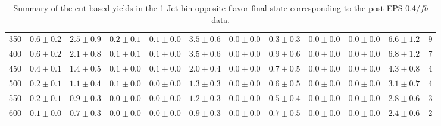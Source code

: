\begin{table}[!hb]
{\begin{center}
\begin{tabular}{l c c c c c c c c c c c }
350 & $0.6\pm0.2$ & $2.5\pm0.9$ & $0.2\pm0.1$ & $0.1\pm0.0$ & $3.5\pm0.6$ & $0.0\pm0.0$ & $0.3\pm0.3$ & $0.0\pm0.0$ & $0.0\pm0.0$ & $6.6\pm1.2$ & 9 \\
400 & $0.6\pm0.2$ & $2.1\pm0.8$ & $0.1\pm0.1$ & $0.1\pm0.0$ & $3.5\pm0.6$ & $0.0\pm0.0$ & $0.9\pm0.6$ & $0.0\pm0.0$ & $0.0\pm0.0$ & $6.8\pm1.2$ & 7 \\
450 & $0.4\pm0.1$ & $1.4\pm0.5$ & $0.1\pm0.0$ & $0.1\pm0.0$ & $2.0\pm0.4$ & $0.0\pm0.0$ & $0.7\pm0.5$ & $0.0\pm0.0$ & $0.0\pm0.0$ & $4.3\pm0.8$ & 4 \\
500 & $0.2\pm0.1$ & $1.1\pm0.4$ & $0.1\pm0.0$ & $0.0\pm0.0$ & $1.3\pm0.3$ & $0.0\pm0.0$ & $0.6\pm0.5$ & $0.0\pm0.0$ & $0.0\pm0.0$ & $3.1\pm0.7$ & 4 \\
550 & $0.2\pm0.1$ & $0.9\pm0.3$ & $0.0\pm0.0$ & $0.0\pm0.0$ & $1.2\pm0.3$ & $0.0\pm0.0$ & $0.5\pm0.4$ & $0.0\pm0.0$ & $0.0\pm0.0$ & $2.8\pm0.6$ & 3 \\
600 & $0.1\pm0.0$ & $0.7\pm0.3$ & $0.0\pm0.0$ & $0.0\pm0.0$ & $0.9\pm0.3$ & $0.0\pm0.0$ & $0.7\pm0.5$ & $0.0\pm0.0$ & $0.0\pm0.0$ & $2.4\pm0.6$ & 2 \\
\hline
\end{tabular}
\end{center}
}
\caption{Summary of the cut-based yields in the 1-Jet bin opposite flavor final state corresponding to the post-EPS 0.4$/fb$ data.}
\end{table}

